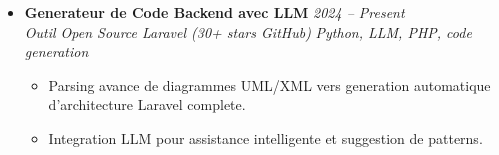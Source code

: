 \documentclass[a4paper,11pt]{article}
\begin{document}
\begin{itemize}[leftmargin=*, label={-}]
\item \textbf{Generateur de Code Backend avec LLM} \hfill \textit{2024 -- Present} \\
\textit{Outil Open Source Laravel (30+ stars GitHub)} \hfill \textit{Python, LLM, PHP, code generation}
\vspace{-2pt}
    \begin{itemize}[leftmargin=0.4cm, nosep, label=\tiny$\bullet$]
        \item \small{Parsing avance de diagrammes UML/XML vers generation automatique d'architecture Laravel complete.}
        \item \small{Integration LLM pour assistance intelligente et suggestion de patterns.}
    \end{itemize}

\end{itemize}
\end{document}
